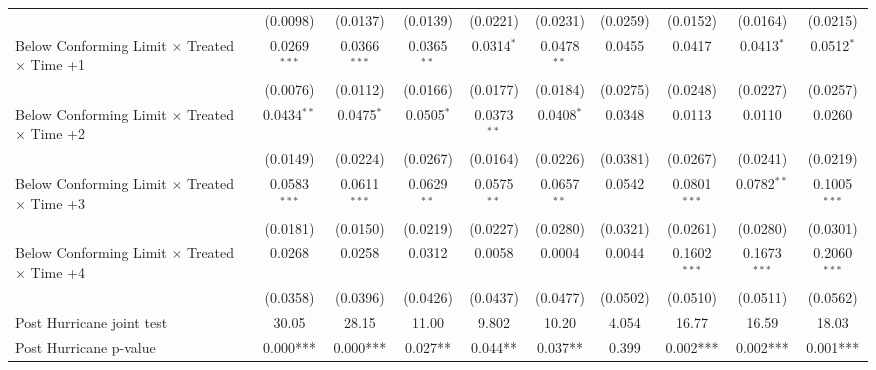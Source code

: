\begin{tabular}{lccccccccc}
                                                              & (0.0098)       & (0.0137)              & (0.0139)      & (0.0221)      & (0.0231)       & (0.0259)     & (0.0152)       & (0.0164)       & (0.0215)\\   
   Below Conforming Limit $\times$ Treated $\times$ Time +1   & 0.0269$^{***}$ & 0.0366$^{***}$        & 0.0365$^{**}$ & 0.0314$^{*}$  & 0.0478$^{**}$  & 0.0455       & 0.0417         & 0.0413$^{*}$   & 0.0512$^{*}$\\   
                                                              & (0.0076)       & (0.0112)              & (0.0166)      & (0.0177)      & (0.0184)       & (0.0275)     & (0.0248)       & (0.0227)       & (0.0257)\\   
   Below Conforming Limit $\times$ Treated $\times$ Time +2   & 0.0434$^{**}$  & 0.0475$^{*}$          & 0.0505$^{*}$  & 0.0373$^{**}$ & 0.0408$^{*}$   & 0.0348       & 0.0113         & 0.0110         & 0.0260\\   
                                                              & (0.0149)       & (0.0224)              & (0.0267)      & (0.0164)      & (0.0226)       & (0.0381)     & (0.0267)       & (0.0241)       & (0.0219)\\   
   Below Conforming Limit $\times$ Treated $\times$ Time +3   & 0.0583$^{***}$ & 0.0611$^{***}$        & 0.0629$^{**}$ & 0.0575$^{**}$ & 0.0657$^{**}$  & 0.0542       & 0.0801$^{***}$ & 0.0782$^{**}$  & 0.1005$^{***}$\\   
                                                              & (0.0181)       & (0.0150)              & (0.0219)      & (0.0227)      & (0.0280)       & (0.0321)     & (0.0261)       & (0.0280)       & (0.0301)\\   
   Below Conforming Limit $\times$ Treated $\times$ Time +4   & 0.0268         & 0.0258                & 0.0312        & 0.0058        & 0.0004         & 0.0044       & 0.1602$^{***}$ & 0.1673$^{***}$ & 0.2060$^{***}$\\   
                                                              & (0.0358)       & (0.0396)              & (0.0426)      & (0.0437)      & (0.0477)       & (0.0502)     & (0.0510)       & (0.0511)       & (0.0562)\\   
   Post Hurricane joint test                                  & 30.05          & 28.15                 & 11.00         & 9.802         & 10.20          & 4.054        & 16.77          & 16.59          & 18.03\\  
   Post Hurricane p-value                                     & 0.000***       & 0.000***              & 0.027**       & 0.044**       & 0.037**        & 0.399        & 0.002***       & 0.002***       & 0.001***\\  

\end{tabular}

